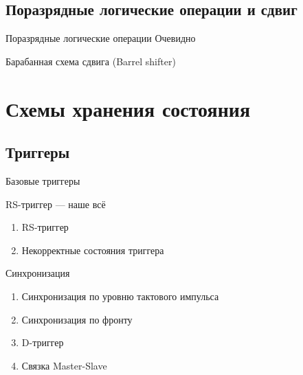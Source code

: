 \documentclass[xetex,aspectratio=43]{beamer}
\begin{document}
\subsection{Поразрядные логические операции и сдвиг}

\begin{frame}{Поразрядные логические операции}
    Очевидно
\end{frame}

\begin{frame}{Барабанная схема сдвига (Barrel shifter)}
    \begin{figure}
        
    \end{figure}
\end{frame}

\section{Схемы хранения состояния}

\subsection{Триггеры}

\begin{frame}{Базовые триггеры}
\end{frame}

\begin{frame}{RS-триггер --- наше всё}
    \begin{enumerate}
        \tightlist
        \item
        RS-триггер
        \item
        Некорректные состояния триггера
    \end{enumerate}
\end{frame}

\begin{frame}{Синхронизация}
    \begin{enumerate}
        \tightlist
        \item
        Синхронизация по уровню тактового импульса
        \item
        Синхронизация по фронту
        \item
        D-триггер
        \item
        Связка Master-Slave
    \end{enumerate}
\end{frame}
\end{document}
